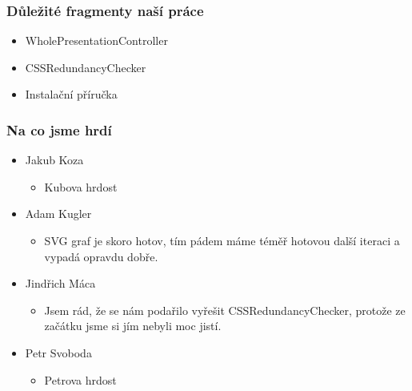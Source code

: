 \documentclass{beamer}
\begin{document}
\begin{frame}[allowframebreaks]\frametitle{Důležité fragmenty naší práce}
  \begin{itemize}
    \item WholePresentationController
		\item CSSRedundancyChecker
		\item Instalační příručka
  \end{itemize}
\end{frame}

\begin{frame}[allowframebreaks]\frametitle{Na co jsme hrdí} 
  \begin{itemize}
    \item Jakub Koza
      \begin{itemize}
       \item Kubova hrdost
     \end{itemize}
   
    \item Adam Kugler
      \begin{itemize}
       \item SVG graf je skoro hotov, tím pádem máme téměř hotovou další iteraci a vypadá opravdu dobře.
     \end{itemize}

    \item Jindřich Máca
      \begin{itemize}
       \item Jsem rád, že se nám podařilo vyřešit CSSRedundancyChecker, protože ze začátku jsme si jím nebyli moc jistí.
      \end{itemize}  
   
    \item Petr Svoboda
      \begin{itemize}
       \item Petrova hrdost
     \end{itemize}
   \end{itemize}  
\end{frame}
\end{document}
